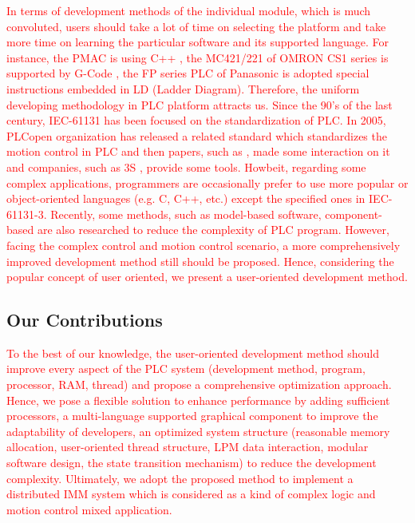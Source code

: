 \documentclass[journal,UTF8]{IEEEtran}
\begin{document}
\textcolor{red}{In terms of development methods of the individual module, which is much convoluted, users should take a lot of time on selecting the platform and take more time on learning the particular software and its supported language. For instance, the PMAC is using C++ \cite{Peng2011Linear,Qian2014A}, the MC421/221 of OMRON CS1 series is supported by G-Code \cite{OMRON2006CS1W}, the FP series PLC of Panasonic is adopted special instructions embedded in LD (Ladder Diagram). Therefore, the uniform developing methodology in PLC platform attracts us. Since the 90's of the last century, IEC-61131 has been focused on the standardization of PLC\cite{IEC1993Programmable}. In 2005, PLCopen organization has released a related standard \cite{PLCopen2005Function} which standardizes the motion control in PLC and then papers, such as \cite{S2006Advanced}, made some interaction on it and companies, such as 3S \cite{3S2017Logic}, provide some tools. Howbeit, regarding some complex applications, programmers are occasionally prefer to use more popular or object-oriented languages (e.g. C, C++, etc.)\cite{Bonfe2001Object, Werner2009Object, Basile2013On} except the specified ones in IEC-61131-3. Recently, some methods, such as model-based software, component-based \cite{Bonf2013Design, Vyatkin2013Software} are also researched to reduce the complexity of PLC program. However, facing the complex control and motion control scenario, a more comprehensively improved development method still should be proposed. Hence, considering the popular concept of user oriented\cite{Verscheure2016User, Choi2017A}, we present a user-oriented development method.} 

\subsection{Our Contributions}
\textcolor{red}{To the best of our knowledge, the user-oriented development method should improve every aspect of the PLC system (development method, program, processor, RAM, thread) and propose a comprehensive optimization approach. Hence, we pose a flexible solution to enhance performance by adding sufficient processors, a multi-language supported graphical component to improve the adaptability of developers, an optimized system structure (reasonable memory allocation, user-oriented thread structure, LPM data interaction, modular software design, the state transition mechanism) to reduce the development complexity. Ultimately, we adopt the proposed method to implement a distributed IMM system which is considered as a kind of complex logic and motion control mixed application.}
\end{document}
